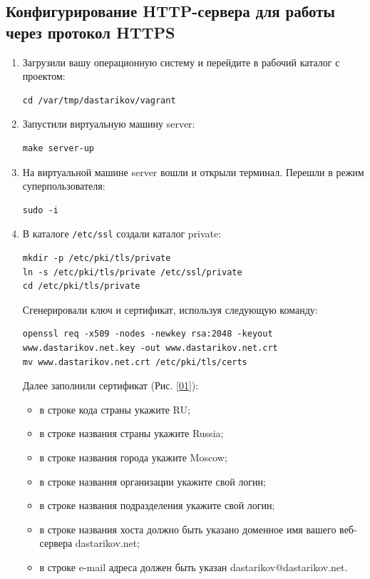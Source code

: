 \subsection{Конфигурирование HTTP-сервера для работы через протокол HTTPS}
\begin{enumerate}
\item Загрузили вашу операционную систему и перейдите в рабочий каталог с проектом:
\begin{verbatim}
cd /var/tmp/dastarikov/vagrant
\end{verbatim}
\item Запустили виртуальную машину server:
\begin{verbatim}
make server-up
\end{verbatim}
\item На виртуальной машине server вошли и открыли терминал. Перешли в режим суперпользователя:
\begin{verbatim}
sudo -i
\end{verbatim}
\item В каталоге \texttt{/etc/ssl} создали каталог private:
\begin{verbatim}
mkdir -p /etc/pki/tls/private
ln -s /etc/pki/tls/private /etc/ssl/private
cd /etc/pki/tls/private
\end{verbatim}
Сгенерировали ключ и сертификат, используя следующую команду:
\begin{verbatim}
openssl req -x509 -nodes -newkey rsa:2048 -keyout www.dastarikov.net.key -out www.dastarikov.net.crt
mv www.dastarikov.net.crt /etc/pki/tls/certs
\end{verbatim}

Далее заполнили сертификат (Рис. \ref{01}):
\begin{itemize}
    \item в строке кода страны укажите RU;
    \item в строке названия страны укажите Russia;
    \item в строке названия города укажите Moscow;
    \item в строке названия организации укажите свой логин;
    \item в строке названия подразделения укажите свой логин;
    \item в строке названия хоста должно быть указано доменное имя вашего веб-сервера dastarikov.net;
    \item в строке e-mail адреса должен быть указан dastarikov@dastarikov.net.
\end{itemize}
    

\end{enumerate}
